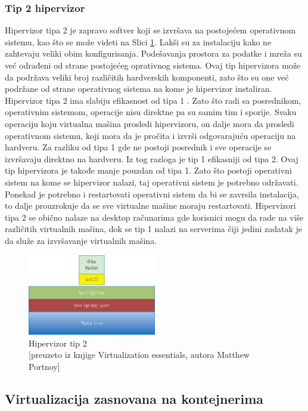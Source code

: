 \documentclass[12pt,oneside]{memoir}
\begin{document}
\subsubsection{Tip 2 hipervizor}
Hipervizor tipa 2 je zapravo softver koji se izvršava na postojećem operativnom sistemu, kao što se može videti na Slici \ref{fig:hipervizorTip2}. Lakši su za instalaciju kako ne zahtevaju veliki obim konfigurisanja. Podešavanja prostora za podatke i mreža su već odrađeni od strane postojećeg oprativnog sistema. Ovaj tip hipervizora može da podržava veliki broj različitih hardverskih komponenti, zato što su one već podržane od strane operativnog sistema na kome je hipervizor instaliran. Hipervizor tipa 2 ima slabiju efikasnost od tipa 1 \cite{ve}. Zato što radi sa posrednikom, operativnim sistemom, operacije nisu direktne pa su samim tim i sporije. Svaku operaciju koju virtualna mašina prosledi hipervizoru, on dalje mora da prosledi operativnom sistemu, koji mora da je pročita i  izvrši odgovarajuću operaciju na hardveru. Za razliku od tipa 1 gde ne postoji posrednik i sve operacije se izvršavaju direktno na hardveru. Iz tog razloga je tip 1 efikasniji od tipa 2. 
Ovaj tip hipervizora je takođe manje pouzdan od tipa 1. Zato što postoji operativni sistem na kome se hipervizor nalazi, taj operativni sistem je potrebno održavati. Ponekad je potrebno i restartovati operativni sistem da bi se zavrsila instalacija, to dalje prouzrokuje da se sve virtualne mašine moraju restartovati. Hipervizori tipa 2 se obično nalaze na desktop računarima gde korisnici mogu da rade na više različitih virtualnih mašina, dok se tip 1 nalazi na serverima čiji jedini zadatak je da služe za izvršavanje virtualnih mašina.

\begin{figure}[!ht]
  \centering
  \includegraphics[width=0.5\textwidth]{Slika 3.jpg}
  \caption{Hipervizor tip 2\\\footnotesize[preuzeto iz knjige Virtualization essentials, autora Matthew Portnoy]}
  \label{fig:hipervizorTip2}
\end{figure}

 
\subsection{Virtualizacija zasnovana na kontejnerima}
\end{document}
